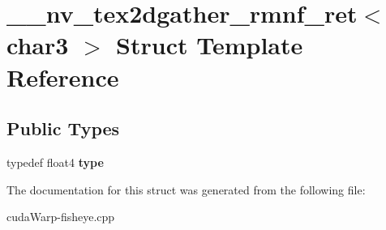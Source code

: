 \hypertarget{struct____nv__tex2dgather__rmnf__ret_3_01char3_01_4}{}\section{\+\_\+\+\_\+nv\+\_\+tex2dgather\+\_\+rmnf\+\_\+ret$<$ char3 $>$ Struct Template Reference}
\label{struct____nv__tex2dgather__rmnf__ret_3_01char3_01_4}
\subsection*{Public Types}
\begin{DoxyCompactItemize}
\item 
typedef float4 {\bfseries type}\hypertarget{struct____nv__tex2dgather__rmnf__ret_3_01char3_01_4_a970aa6ecd77310dfac471e34797e3aeb}{}\label{struct____nv__tex2dgather__rmnf__ret_3_01char3_01_4_a970aa6ecd77310dfac471e34797e3aeb}

\end{DoxyCompactItemize}


The documentation for this struct was generated from the following file\+:\begin{DoxyCompactItemize}
\item 
cuda\+Warp-\/fisheye.\+cpp\end{DoxyCompactItemize}
